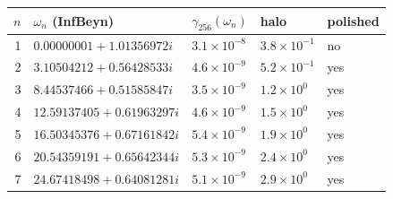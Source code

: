 \begin{tabular}{rllll}
\toprule
$n$ & $\omega_n$ (InfBeyn) & $\gamma_{256}(\omega_n)$ & halo & polished\\
\midrule
1 & $0.00000001+1.01356972i$ & $3.1\times10^{-8}$ & $3.8\times10^{-1}$ & no\\
2 & $3.10504212+0.56428533i$ & $4.6\times10^{-9}$ & $5.2\times10^{-1}$ & yes\\
3 & $8.44537466+0.51585847i$ & $3.5\times10^{-9}$ & $1.2\times10^{0}$ & yes\\
4 & $12.59137405+0.61963297i$ & $4.6\times10^{-9}$ & $1.5\times10^{0}$ & yes\\
5 & $16.50345376+0.67161842i$ & $5.4\times10^{-9}$ & $1.9\times10^{0}$ & yes\\
6 & $20.54359191+0.65642344i$ & $5.3\times10^{-9}$ & $2.4\times10^{0}$ & yes\\
7 & $24.67418498+0.64081281i$ & $5.1\times10^{-9}$ & $2.9\times10^{0}$ & yes\\
\bottomrule
\end{tabular}

